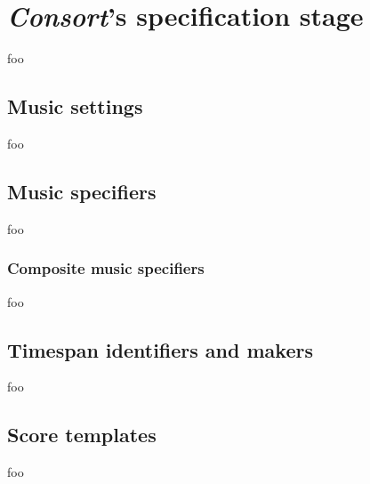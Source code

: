 \chapter{\emph{Consort}'s specification stage}

foo

\section{Music settings}

foo

\section{Music specifiers}

foo

\subsection{Composite music specifiers}

foo

\section{Timespan identifiers and makers}

foo

\section{Score templates}

foo